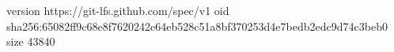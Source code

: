 version https://git-lfs.github.com/spec/v1
oid sha256:65082ff9c68e8f7620242e64eb528c51a8bf370253d4e7bedb2edc9d74c3beb0
size 43840
